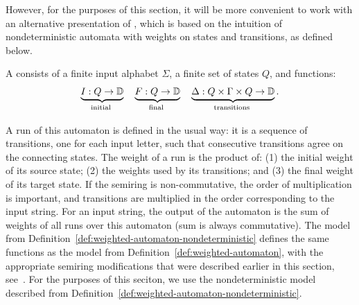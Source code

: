 However, for the purposes of this section, it  will be more convenient to work with an alternative presentation of , which is based on the intuition of nondeterministic automata with weights on states and transitions, as defined below. 
\begin{definition}
    \label{def:weighted-automaton-nondeterministic}
    A  consists of a finite input alphabet $\Sigma$,  a finite set of states $Q$, and functions: 
    \begin{align*}
    \myunderbrace{I : Q \to \domain}{initial}
    \quad
    \myunderbrace{F : Q \to \domain}{final}
    \quad
    \myunderbrace{\Delta : Q \times \Gamma \times Q \to \domain}{transitions}.
    \end{align*}
\end{definition}
 A run of this automaton is defined in the usual way: it is a sequence of transitions, one for each input letter, such that consecutive transitions agree on the connecting states. The weight of a run is the product of: (1) the initial weight of its source state; (2) the weights used by its transitions; and (3) the final weight of its target state. If the semiring is non-commutative, the order of multiplication is  important, and transitions are multiplied in the order corresponding to the input string. For an input string, the output of the automaton is the sum of weights of all runs over this automaton (sum is always commutative).  The model from Definition~\ref{def:weighted-automaton-nondeterministic}  defines the same functions as the model from Definition~\ref{def:weighted-automaton}, with the appropriate semiring modifications that were described earlier in this section, see~\cite[Lemma 8.3]{bojanczyk_automata_2025}. For the purposes of this seciton, we use the nondeterministic  model described from Definition~\ref{def:weighted-automaton-nondeterministic}.



